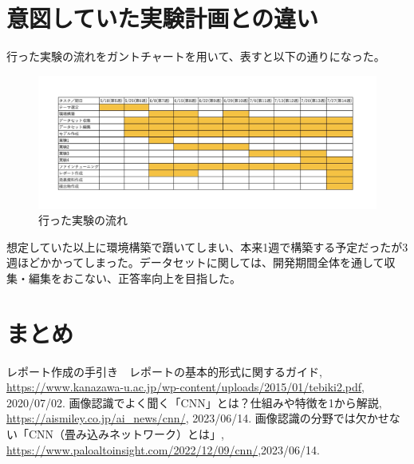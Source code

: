 \documentclass[a4paper, 11pt, titlepage]{jsarticle}
\begin{document}
\section{意図していた実験計画との違い}
行った実験の流れをガントチャートを用いて、表すと以下の通りになった。\par
\begin{figure}[htbp]
\begin{center}
\includegraphics[width=150mm]{G2_Ganttchart.jpeg}
\caption{行った実験の流れ}
\end{center}
\end{figure}
想定していた以上に環境構築で躓いてしまい、本来1週で構築する予定だったが3週ほどかかってしまった。データセットに関しては、開発期間全体を通して収集・編集をおこない、正答率向上を目指した。

\section{まとめ}


\begin{thebibliography}{n}
  レポート作成の手引き　レポートの基本的形式に関するガイド, \url{https://www.kanazawa-u.ac.jp/wp-content/uploads/2015/01/tebiki2.pdf}, 2020/07/02.
	画像認識でよく聞く「CNN」とは？仕組みや特徴を1から解説, \url{https://aismiley.co.jp/ai_news/cnn/}, 2023/06/14.
	画像認識の分野では欠かせない「CNN（畳み込みネットワーク）とは」, \url{https://www.paloaltoinsight.com/2022/12/09/cnn/},2023/06/14.
\end{thebibliography}
\end{document}
